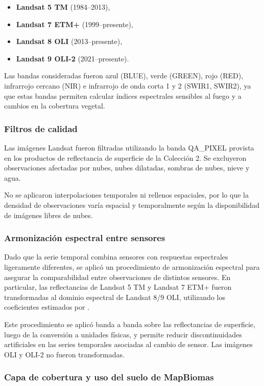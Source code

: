 \documentclass[11pt,a4paper]{article}
\begin{document}
\begin{itemize}
  \item \textbf{Landsat 5 TM} (1984--2013),
  \item \textbf{Landsat 7 ETM+} (1999--presente),
  \item \textbf{Landsat 8 OLI} (2013--presente),
  \item \textbf{Landsat 9 OLI-2} (2021--presente).
\end{itemize}

Las bandas consideradas fueron azul (BLUE), verde (GREEN), rojo (RED), infrarrojo cercano (NIR) e infrarrojo de onda corta 1 y 2 (SWIR1, SWIR2), ya que estas bandas permiten calcular índices espectrales sensibles al fuego y a cambios en la cobertura vegetal.

\subsubsection{Filtros de calidad}

Las imágenes Landsat fueron filtradas utilizando la banda QA\_PIXEL provista en los productos de reflectancia de superficie de la Colección 2. Se excluyeron observaciones afectadas por nubes, nubes dilatadas, sombras de nubes, nieve y agua.

No se aplicaron interpolaciones temporales ni rellenos espaciales, por lo que la densidad de observaciones varía espacial y temporalmente según la disponibilidad de imágenes libres de nubes.

\subsubsection{Armonización espectral entre sensores}

Dado que la serie temporal combina sensores con respuestas espectrales ligeramente diferentes, se aplicó un procedimiento de armonización espectral para asegurar la comparabilidad entre observaciones de distintos sensores. En particular, las reflectancias de Landsat 5 TM y Landsat 7 ETM+ fueron transformadas al dominio espectral de Landsat 8/9 OLI, utilizando los coeficientes estimados por \textcite{roy2016harmonization}.

Este procedimiento se aplicó banda a banda sobre las reflectancias de superficie, luego de la conversión a unidades físicas, y permite reducir discontinuidades artificiales en las series temporales asociadas al cambio de sensor. Las imágenes OLI y OLI-2 no fueron transformadas.

\subsubsection{Capa de cobertura y uso del suelo de MapBiomas}
\end{document}
